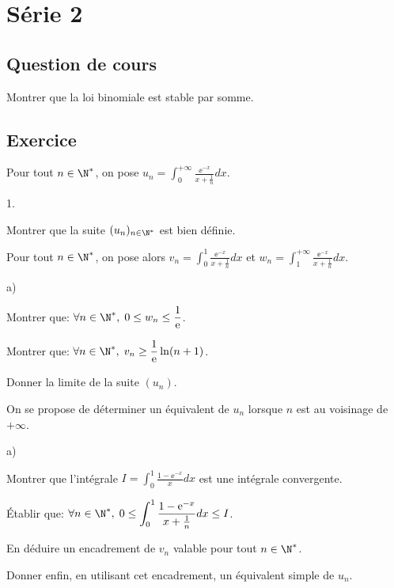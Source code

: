 \documentclass[11pt]{article}%
\begin{document}
\newpage

\section*{Série 2}
\subsection*{Question de cours}
\noindent
Montrer que la loi binomiale est stable par somme.

\subsection*{Exercice}
\noindent
Pour tout $n\in\N^{*}$, on pose ${\displaystyle 
u_{n}=\int_{0}^{+\infty}{\frac{\ee^{-x}}{x+\frac{1}{n}}dx}}$.

\begin{noliste}{1.}
\item Montrer que la suite $(u_{n})_{n\in\N^{*}}$ est bien définie.
\item Pour tout $n\in\N^{*}$, on pose alors ${\displaystyle 
v_{n}=\int_{0}^{1}{\frac{\ee^{-x}}{x+\frac{1}{n}}dx}}$
et ${\displaystyle 
w_{n}=\int_{1}^{+\infty}{\frac{\ee^{-x}}{x+\frac{1}{n}}dx}}$.

\begin{noliste}{a)}
\item Montrer que: ${\displaystyle \forall n\in\N^{*},\;0\le 
w_{n}\le\frac{1}{\ee}}$.
\item Montrer que: ${\displaystyle \forall n\in\N^{*},\; 
v_{n}\ge\frac{1}{\ee}\ln(n+1)}$.
\item Donner la limite de la suite $(u_{n})$.
\end{noliste}
\item On se propose de déterminer un équivalent de $u_{n}$ lorsque $n$
est au voisinage de $+\infty$.

\begin{noliste}{a)}
\item Montrer que l'intégrale ${\displaystyle 
I=\int_{0}^{1}{\frac{1-\ee^{-x}}{x}dx}}$
est une intégrale convergente.
\item Établir que: ${\displaystyle \forall 
n\in\N^{*},\;0\le\int_{0}^{1}{\frac{1-\ee^{-x}}{x+\frac{1}{n}}dx}\le I}$.
\item En déduire un encadrement de $v_{n}$ valable pour tout 
$n\in\N^{*}$.
\item Donner enfin, en utilisant cet encadrement, un équivalent simple 
de
$u_{n}$.
\end{noliste}
\end{noliste}
\end{document}
